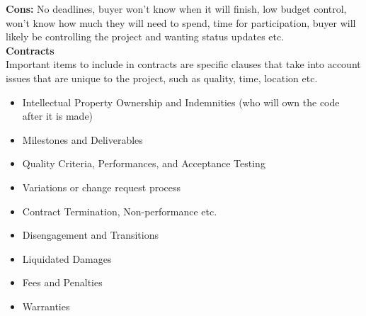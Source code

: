 \documentclass[a4paper,10pt]{article}
\begin{document}
\textbf{Cons:} No deadlines, buyer won't know when it will finish, low budget control, won't know how much they will need to spend, time for participation, buyer will likely be controlling the project and wanting status updates etc. \\ 
\textcolor{BlueGreen}{\textbf{Contracts}} \\ 
Important items to include in contracts are specific clauses that take into account issues that are unique to the project, such as quality, time, location etc. 
\begin{itemize}
	\item Intellectual Property Ownership and Indemnities (who will own the code after it is made)
	\item Milestones and Deliverables 
	\item Quality Criteria, Performances, and Acceptance Testing 
	\item Variations or change request process 
	\item Contract Termination, Non-performance etc. 
	\item Disengagement and Transitions 
	\item Liquidated Damages 
	\item Fees and Penalties 
	\item Warranties 
\end{itemize}
\newpage
\end{document}
